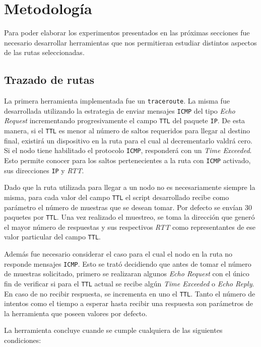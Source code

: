 \section{Metodología}

Para poder elaborar los experimentos presentados en las próximas secciones fue
necesario desarrollar herramientas que nos permitieran estudiar distintos
aspectos de las rutas seleccionadas.

\subsection{Trazado de rutas}

La primera herramienta implementada fue un \texttt{traceroute}. La misma fue
desarrollada utilizando la estrategia de enviar mensajes \texttt{ICMP} del tipo
\emph{Echo Request} incrementando progresivamente el campo \texttt{TTL}
del paquete \texttt{IP}. De esta manera, si el \texttt{TTL} es menor al número
de saltos requeridos para llegar al destino final, existirá un dispositivo en la
ruta para el cual al decrementarlo valdrá cero. Si el nodo tiene habilitado
el protocolo \texttt{ICMP}, responderá con un \emph{Time Exceeded}. Esto permite
conocer para los saltos pertenecientes a la ruta con \texttt{ICMP} activado, sus
direcciones \texttt{IP} y \emph{RTT}.

Dado que la ruta utilizada para llegar a un nodo no es necesariamente
siempre la misma, para cada valor del campo \texttt{TTL} el script desarrollado
recibe como parámetro el número de muestras que se desean tomar. Por defecto se
envían 30 paquetes por \texttt{TTL}. Una vez realizado el muestreo, se toma la
dirección que generó el mayor número de respuestas y sus respectivos \emph{RTT}
como representantes de ese valor particular del campo \texttt{TTL}.

Además fue necesario considerar el caso para el cual el nodo en la ruta no
responde mensajes \texttt{ICMP}. Esto se trató decidiendo que antes de tomar
el número de muestras solicitado, primero se realizaran algunos \emph{Echo
Request} con el único fin de verificar si para el \texttt{TTL} actual se recibe algún
\emph{Time Exceeded} o \emph{Echo Reply}. En caso de no recibir respuesta, se
incrementa en uno el \texttt{TTL}. Tanto el número de intentos como el tiempo a
esperar hasta recibir una respuesta son parámetros de la herramienta que poseen
valores por defecto.

La herramienta concluye cuande se cumple cualquiera de las siguientes
condiciones:

